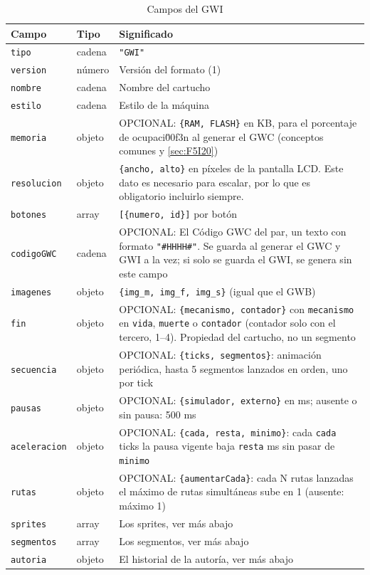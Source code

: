 {}

\begin{table}[H]
	\centering
	\small
	\begin{tabularx}{\textwidth}{@{} l l X @{}}
		\toprule
		\textbf{Campo} & \textbf{Tipo} & \textbf{Significado} \\
		\midrule
		\texttt{tipo} & cadena & \texttt{"GWI"} \\
		\texttt{version} & número & Versión del formato (1) \\
		\texttt{nombre} & cadena & Nombre del cartucho \\
		\texttt{estilo} & cadena & Estilo de la máquina \\
		\texttt{memoria} & objeto & OPCIONAL: \texttt{\{RAM, FLASH\}} en KB, para el porcentaje de ocupaci\u00f3n al generar el GWC (conceptos comunes y \ref{sec:F5I20}) \\
		\texttt{resolucion}\footnotemark\setcounter{fnGWIuno}{\value{footnote}} & objeto & \texttt{\{ancho, alto\}} en píxeles de la pantalla LCD. Este dato es necesario para escalar, por lo que es obligatorio incluirlo siempre.\\
		\texttt{botones} & array & \texttt{[\{numero, id\}]} por botón \\
		\texttt{codigoGWC}\footnotemark\setcounter{fnGWIdos}{\value{footnote}} & cadena & OPCIONAL: El Código GWC del par, un texto con formato \texttt{"\#HHHH\#"}. Se guarda al generar el GWC y GWI a la vez; si solo se guarda el GWI, se genera sin este campo \\
		\texttt{imagenes} & objeto & \texttt{\{img\_m, img\_f, img\_s\}} (igual que el GWB) \\
		\texttt{fin} & objeto & OPCIONAL: \texttt{\{mecanismo, contador\}} con \texttt{mecanismo} en \texttt{vida}, \texttt{muerte} o \texttt{contador} (contador solo con el tercero, 1--4). Propiedad del cartucho, no un segmento \\
		\texttt{secuencia} & objeto & OPCIONAL: \texttt{\{ticks, segmentos\}}: animación periódica, hasta 5 segmentos lanzados en orden, uno por tick \\
		\texttt{pausas} & objeto & OPCIONAL: \texttt{\{simulador, externo\}} en ms; ausente o sin pausa: 500 ms \\
		\texttt{aceleracion} & objeto & OPCIONAL: \texttt{\{cada, resta, minimo\}}: cada \texttt{cada} ticks la pausa vigente baja \texttt{resta} ms sin pasar de \texttt{minimo} \\
		\texttt{rutas} & objeto & OPCIONAL: \texttt{\{aumentarCada\}}: cada N rutas lanzadas el máximo de rutas simultáneas sube en 1 (ausente: máximo 1) \\
		\texttt{sprites} & array & Los sprites, ver más abajo \\
		\texttt{segmentos} & array & Los segmentos, ver más abajo \\
		\texttt{autoria} & objeto & El historial de la autoría, ver más abajo \\
		\bottomrule
	\end{tabularx}
	\caption{Campos del GWI}
	\label{tab:F1A01GWI}
\end{table}

